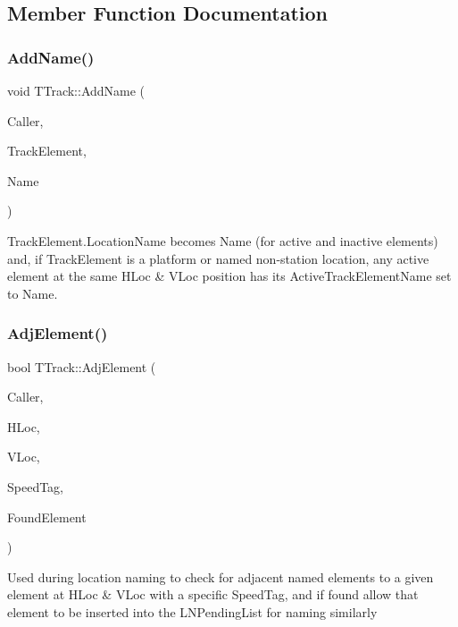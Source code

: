 \subsection{Member Function Documentation}
\mbox{\label{class_t_track_a306dfdff414c8edf6f974d21bd9b83ce}} 
\subsubsection{\texorpdfstring{Add\+Name()}{AddName()}}
{\footnotesize\ttfamily void T\+Track\+::\+Add\+Name (\begin{DoxyParamCaption}\item[{int}]{Caller,  }\item[{T\+Track\+Vector\+Iterator}]{Track\+Element,  }\item[{Ansi\+String}]{Name }\end{DoxyParamCaption})}

Track\+Element.\+Location\+Name becomes \textquotesingle{}Name\textquotesingle{} (for active and inactive elements) and, if Track\+Element is a platform or named non-\/station location, any active element at the same H\+Loc \& V\+Loc position has its Active\+Track\+Element\+Name set to \textquotesingle{}Name\textquotesingle{}. \mbox{\label{class_t_track_a607c6164af3158c328dd7c3ae25236c7}} 
\subsubsection{\texorpdfstring{Adj\+Element()}{AdjElement()}}
{\footnotesize\ttfamily bool T\+Track\+::\+Adj\+Element (\begin{DoxyParamCaption}\item[{int}]{Caller,  }\item[{int}]{H\+Loc,  }\item[{int}]{V\+Loc,  }\item[{int}]{Speed\+Tag,  }\item[{int \&}]{Found\+Element }\end{DoxyParamCaption})}

Used during location naming to check for adjacent named elements to a given element at H\+Loc \& V\+Loc with a specific Speed\+Tag, and if found allow that element to be inserted into the L\+N\+Pending\+List for naming similarly \mbox{\label{class_t_track_a96a3a6bcd38491f4f00ec2a585c6f170}} 

